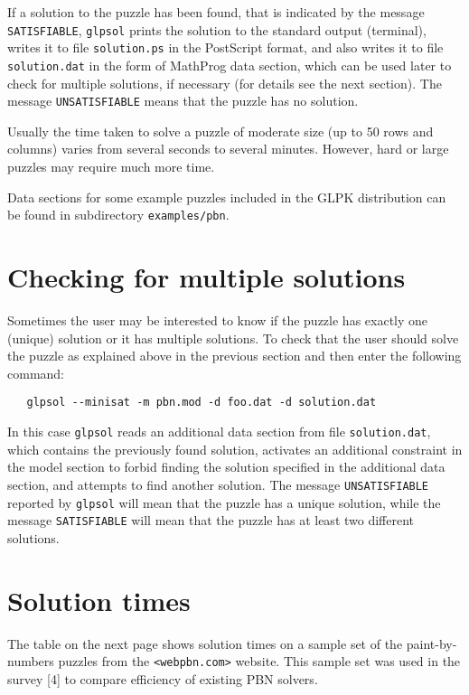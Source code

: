\documentclass[11pt,draft]{article}
\begin{document}
If a solution to the puzzle has been found, that is indicated by the
message \verb|SATISFIABLE|, \verb|glpsol| prints the solution to the
standard output (terminal), writes it to file \verb|solution.ps| in the
PostScript format, and also writes it to file \verb|solution.dat| in the
form of MathProg data section, which can be used later to check for
multiple solutions, if necessary (for details see the next section).
The message \verb|UNSATISFIABLE| means that the puzzle has no solution.

Usually the time taken to solve a puzzle of moderate size (up to 50 rows
and columns) varies from several seconds to several minutes. However,
hard or large puzzles may require much more time.

Data sections for some example puzzles included in the GLPK distribution
can be found in subdirectory \verb|examples/pbn|.

\section{Checking for multiple solutions}

Sometimes the user may be interested to know if the puzzle has exactly
one (unique) solution or it has multiple solutions. To check that the
user should solve the puzzle as explained above in the previous section
and then enter the following command:

\begin{verbatim}
   glpsol --minisat -m pbn.mod -d foo.dat -d solution.dat
\end{verbatim}

\noindent
In this case \verb|glpsol| reads an additional data section from file
\verb|solution.dat|, which contains the previously found solution,
activates an additional constraint in the model section to forbid
finding the solution specified in the additional data section, and
attempts to find another solution. The message \verb|UNSATISFIABLE|
reported by \verb|glpsol| will mean that the puzzle has a unique
solution, while the message \verb|SATISFIABLE| will mean that the puzzle
has at least two different solutions.

\newpage

\section{Solution times}

The table on the next page shows solution times on a sample set of
the paint-by-numbers puzzles from the \verb|<webpbn.com>| website.
This sample set was used in the survey [4] to compare efficiency of
existing PBN solvers.
\end{document}

